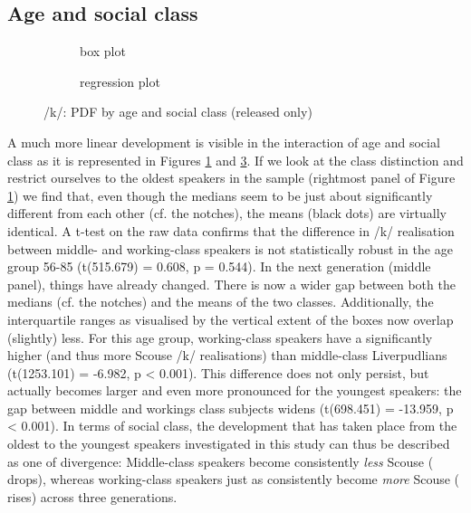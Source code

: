 \subsection{Age and social class}
\label{sec.prod.res.con.k.ageclass}

\begin{figure}[h]
	\centering
	\begin{subfigure}{.49\textwidth}
		\centering
			\resizebox{\linewidth}{!}{} 
		\caption{box plot}
		\label{fig.box.k.ageclass}
	\end{subfigure}
	\begin{subfigure}{.49\textwidth}
		\centering
			\resizebox{\linewidth}{!}{} 
		\caption{regression plot}
		\label{fig.scatter.k.ageclass}
	\end{subfigure}
	\caption{/k/: PDF by age and social class (released only)}
\end{figure}

A much more linear development is visible in the interaction of age and social class as it is represented in Figures \ref{fig.box.k.ageclass} and \ref{fig.scatter.k.ageclass}.
If we look at the class distinction and restrict ourselves to the oldest speakers in the sample (rightmost panel of Figure \ref{fig.box.k.ageclass}) we find that, even though the medians seem to be just about significantly different from each other (cf. the notches), the means (black dots) are virtually identical.
A t-test on the raw data confirms that the difference in /k/ realisation between middle- and working-class speakers is not statistically robust in the age group 56-85 (t(515.679) = 0.608, p = 0.544).
In the next generation (middle panel), things have already changed.
There is now a wider gap between both the medians (cf. the notches) and the means of the two classes.
Additionally, the interquartile ranges as visualised by the vertical extent of the boxes now overlap (slightly) less.
For this age group, working-class speakers have a significantly higher  (and thus more Scouse /k/ realisations) than middle-class Liverpudlians (t(1253.101) = -6.982, p < 0.001).
This difference does not only persist, but actually becomes larger and even more pronounced for the youngest speakers: the gap between middle and workings class subjects widens (t(698.451) = -13.959, p < 0.001).
In terms of social class, the development that has taken place from the oldest to the youngest speakers investigated in this study can thus be described as one of divergence: Middle-class speakers become consistently \emph{less} Scouse ( drops), whereas working-class speakers just as consistently become \emph{more} Scouse ( rises) across three generations.

